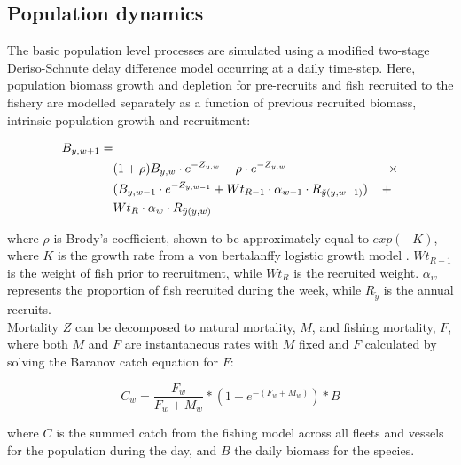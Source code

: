 \documentclass[review]{elsarticle}
\begin{document}
\subsection{Population dynamics}

The basic population level processes are simulated using a modified two-stage
Deriso-Schnute delay difference model \cite{Deriso1980, Schnute1985,
	Dichmont2003} occurring at a daily time-step. Here, population biomass
growth and depletion for pre-recruits and fish recruited to the fishery are
modelled separately as a function of previous recruited biomass, intrinsic
population growth and recruitment:

\begin{equation*}
	\begin{split}
	B_{y,w+1} = &\\
	& (1 + \rho) B_{y,w} \cdot e^{-Z_{y,w}} - \rho \cdot e^{-Z_{y,w}} \hspace{2.9cm}
	\times \\  
	& (B_{y,w-1} \cdot e^{-Z_{y,w-1}} + Wt_{R-1} \cdot \alpha_{w-1} \cdot R_{\tilde{y}(y,w-1)})
	\hspace{0.4cm} + \\
	& Wt_{R} \cdot \alpha_{w} \cdot R_{\tilde{y}(y,w)} 
	\end{split}
\end{equation*}

where $\rho$ is Brody's coefficient, shown to be approximately equal to
$exp(-K)$, where $K$ is the growth rate from a von bertalanffy logistic growth
model \cite{Schnute1985}. $Wt_{R-1}$ is the weight of fish prior to
recruitment, while $Wt_{R}$ is the recruited weight. $\alpha_{w}$ represents
the proportion of fish recruited during the week, while $R_{\tilde{y}}$ is the
annual recruits. \\

Mortality $Z$ can be decomposed to natural mortality, $M$, and fishing
mortality, $F$, where both $M$ and $F$ are instantaneous rates with $M$ fixed
and $F$ calculated by solving the Baranov catch equation \cite{Hilborn1992b}
for $F$:

\begin{equation*}
C_{w} = \frac{F_{w}}{F_{w}+M_{w}} * (1 - e^{-(F_{w} + M_{w})}) * B
\end{equation*}

where $C$ is the summed catch from the fishing model across all fleets and
vessels for the population during the day, and $B$ the daily biomass for the
species. \\
\end{document}
